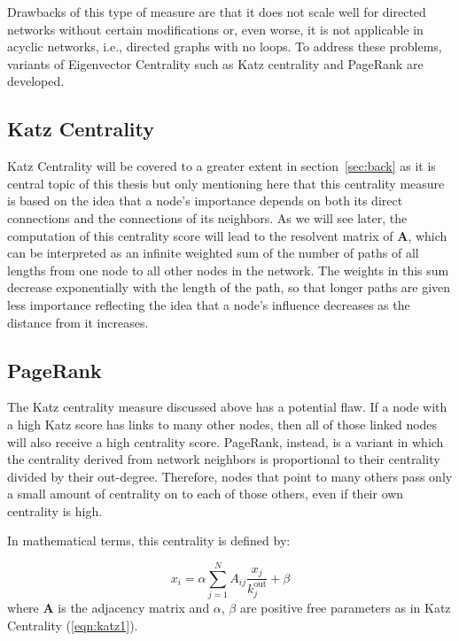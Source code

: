 Drawbacks of this type of measure are that it does not scale well for directed networks without certain modifications or, even worse, it is not applicable in acyclic networks, i.e., directed graphs with no loops. To address these problems, variants of Eigenvector Centrality such as Katz centrality and PageRank are developed.

\subsection*{Katz Centrality}
Katz Centrality will be covered to a greater extent in section~\ref{sec:back} as it is central topic of this thesis but only mentioning here that this centrality measure is based on the idea that a node's importance depends on both its direct connections and the connections of its neighbors. As we will see later, the computation of this centrality score will lead to the resolvent matrix of $\mathbf{A}$, which can be interpreted as an infinite weighted sum of the number of paths of all lengths from one node to all other nodes in the network. The weights in this sum decrease exponentially with the length of the path, so that longer paths are given less importance reflecting the idea that a node's influence decreases as the distance from it increases. 


\subsection*{PageRank}

The Katz centrality measure discussed above has a potential flaw. If a node with a high Katz score has links to many other nodes, then all of those linked nodes will also receive a high centrality score. PageRank, instead, is a variant in which the centrality derived from network neighbors is proportional to their centrality divided by their out-degree. Therefore, nodes that point to many others pass only a small amount of centrality on to each of those others, even if their own centrality is high.

In mathematical terms, this centrality is defined by:

\begin{equation}
\label{eqn:pr1}
    x_i= \alpha\sum_{j=1}^{N}A_{ij}\frac{x_j}{k_j^{\text{out}}} + \beta
\end{equation}
where $\mathbf{A}$ is the adjacency matrix and $\alpha$, $\beta$ are positive free parameters as in Katz Centrality (\ref{eqn:katz1}).

